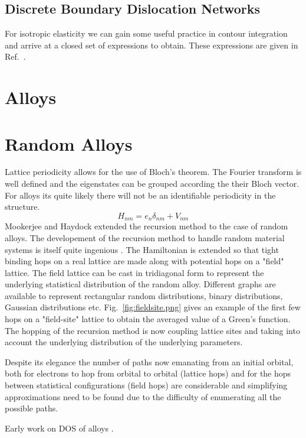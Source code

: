\subsection{Discrete Boundary Dislocation Networks}
For isotropic elasticity we can gain some useful practice in contour integration and arrive
at a closed set of expressions to obtain. These expressions are given in Ref.~\cite{sutton95}.

\section{Alloys}
\cite{glaser81}
\section{Random Alloys}
Lattice periodicity allows for the use of Bloch's theorem. The Fourier transform
is well defined and the eigenstates can be grouped according the their Bloch vector.
For alloys its quite likely there will not be an identifiable periodicity in 
the structure.
%
\begin{equation}
H_{nm} = e_{n}\delta_{nm} + V_{nm}
\end{equation}
%
Mookerjee and Haydock extended the recursion method to the case of random alloys.
The developement of the recursion method to handle random material systems is 
itself quite ingenious \cite{mookerjee, haydock74}. The Hamiltonian is extended
so that tight binding hops on a real lattice are made along with potential hops
on a "field" lattice. The field lattice can be cast in tridiagonal form to represent
the underlying statistical distribution of the random alloy. Different graphs are available
to represent rectangular random distributions, binary distributions, Gaussian distributions
etc. Fig.~\ref{fig:fieldsite.png} gives an example of the first few hops on a "field-site" 
lattice to obtain the averaged value of a Green's function. The hopping of the recursion method
is now coupling lattice sites and taking into account the underlying distribution of 
the underlying parameters.

Despite its elegance the number of paths now emanating from an initial orbital, both
for electrons to hop from orbital to orbital (lattice hops) and for the hops between 
statistical configurations (field hops) are considerable and simplifying approximations 
need to be found due to the difficulty of enumerating all the possible paths.

Early work on DOS of alloys \cite{cubiotti77}. 

